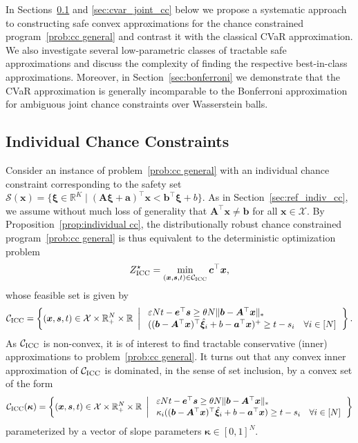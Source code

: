 \documentclass[nonblindrev]{informs2017}
\newcommand{\bmh}[1]{\hat{\bm{#1}}}
\newcommand{\1}[1]{\mathds{1}{\left(#1\right)}}
\begin{document}
In Sections~\ref{sec:cvar_individual_cc} and \ref{sec:cvar_joint_cc} below we propose a systematic approach to constructing safe convex approximations for the chance constrained program~\eqref{prob:cc general} and contrast it with the classical CVaR approximation. We also investigate several low-parametric classes of tractable safe approximations and discuss the complexity of finding the respective best-in-class approximations. Moreover, in Section~\ref{sec:bonferroni} we demonstrate that the CVaR approximation is generally incomparable to the Bonferroni approximation for ambiguous joint chance constraints over Wasserstein balls. 


\subsection{Individual Chance Constraints}\label{sec:cvar_individual_cc}
Consider an instance of problem~\eqref{prob:cc general} with an individual chance constraint corresponding to the safety set $\mathcal{S}(\bm{x}) = \{\bm{\xi} \in \mathbb{R}^K \mid (\bm{A}\bm{\xi} + \bm{a})^\top \bm{x} < \bm{b}^\top\bm{\xi} + b\}$. As in Section~\ref{sec:ref_indiv_cc}, we assume without much loss of generality that $\bm{A}^\top\bm{x} \ne \bm{b}$ for all $\bm{x} \in \mathcal{X}$. By Proposition~\ref{prop:individual cc}, the distributionally robust chance constrained program~\eqref{prob:cc general} is thus equivalent to the deterministic optimization problem 
\begin{equation}
\label{prob:individual cc reformulation abstract}
Z^\star_{\rm ICC}= \min_{(\bm{x},\bm{s}, t)\in \mathcal{C}_{\rm ICC}} \bm c^\top \bm x,
\end{equation}
whose feasible set is given by
\begin{equation*}
\mathcal{C}_{\rm ICC} = \left\{(\bm{x},\bm{s}, t) \in \mathcal{X} \times \mathbb{R}^N_+ \times \mathbb{R} ~\left|~
\begin{array}{l}
\varepsilon N t - \bm{e}^\top\bm{s} \geq \theta N \|\bm{b} - \bm{A}^\top\bm{x}\|_* \\
((\bm{b} - \bm{A}^\top\bm{x})^\top\bmh{\xi}_i + b - \bm{a}^\top\bm{x})^+ \geq t - s_i \quad \forall i \in [N] 
\end{array}
\right.\right\}.
\end{equation*}	
As $\mathcal{C}_{\rm ICC}$ is non-convex, it is of interest to find tractable conservative (inner) approximations to problem~\eqref{prob:cc general}. It turns out that any convex inner approximation of  $\mathcal{C}_{\rm ICC}$ is dominated, in the sense of set inclusion, by a convex set of the form
\begin{equation*}
\mathcal{C}_{\rm ICC}(\bm{\kappa}) = \left\{(\bm{x},\bm{s}, t) \in \mathcal{X} \times \mathbb{R}^N_+ \times \mathbb{R} ~\left|~
\begin{array}{l}
\varepsilon N t - \bm{e}^\top\bm{s} \geq \theta N \|\bm{b} - \bm{A}^\top\bm{x}\|_* \\
\kappa_i ((\bm{b} - \bm{A}^\top\bm{x})^\top\bmh{\xi}_i + b - \bm{a}^\top\bm{x}) \geq t - s_i \quad \forall i \in [N] 
\end{array}
\right.\right\}
\end{equation*}	
parameterized by a vector of slope parameters $\bm \kappa \in [0,1]^N$.
\end{document}
